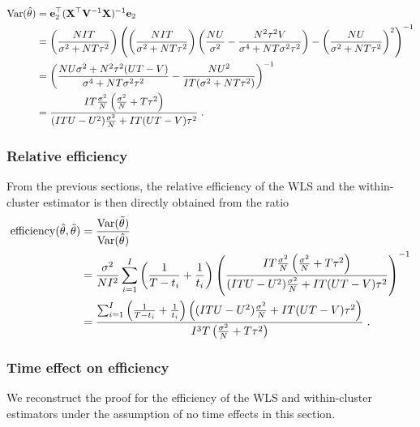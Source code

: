 \documentclass[10pt]{article}
\begin{document}
\begin{align*}
\mathrm{Var}(\hat{\theta}) &= \mathbf{e}_2^\top(\mathbf{X}^\top\mathbf{V}^{-1}\mathbf{X})^{-1}\mathbf{e}_2 \\
&= \left(\frac{NIT}{\sigma^2+NT\tau^2}\right)\left(\left(\frac{NIT}{\sigma^2+NT\tau^2}\right)\left(\frac{NU}{\sigma^2} - \frac{N^2\tau^2V}{\sigma^4+NT\sigma^2\tau^2}\right)-\left(\frac{NU}{\sigma^2+NT\tau^2}\right)^2\right)^{-1} \\
&= \left(\frac{NU\sigma^2+N^2\tau^2(UT-V)}{\sigma^4+NT\sigma^2\tau^2}-\frac{NU^2}{IT(\sigma^2+NT\tau^2)}\right)^{-1} \\
&= \frac{IT\frac{\sigma^2}{N}\left(\frac{\sigma^2}{N}+T\tau^2\right)}{(ITU-U^2)\frac{\sigma^2}{N}+IT(UT-V)\tau^2} \;.
\end{align*}

\subsubsection{Relative efficiency}

From the previous sections, the relative efficiency of the WLS and the within-cluster estimator is then directly obtained from the ratio
\begin{align*}
\mathrm{efficiency}(\hat{\theta},\tilde{\theta}) &= \frac{\mathrm{Var}(\tilde{\theta})}{\mathrm{Var}(\hat{\theta})} \\
&= \frac{\sigma^2}{NI^2}\sum_{i=1}^I\left(\frac{1}{T-t_i} + \frac{1}{t_i}\right)\left(\frac{IT\frac{\sigma^2}{N}\left(\frac{\sigma^2}{N}+T\tau^2\right)}{(ITU-U^2)\frac{\sigma^2}{N}+IT(UT-V)\tau^2}\right)^{-1} \\
&= \frac{\sum_{i=1}^I\left(\frac{1}{T-t_i} + \frac{1}{t_i}\right)\left((ITU-U^2)\frac{\sigma^2}{N}+IT(UT-V)\tau^2\right)}{I^3T\left(\frac{\sigma^2}{N}+T\tau^2\right)} \;.
\end{align*}

\subsubsection{Time effect on efficiency}

We reconstruct the proof for the efficiency of the WLS and within-cluster estimators under the assumption of no time effects in this section.
\end{document}

